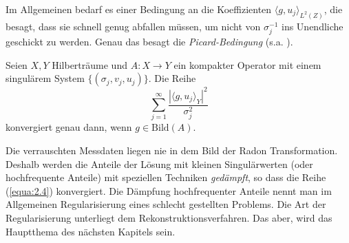 Im Allgemeinen bedarf es einer Bedingung an die Koeffizienten $\langle g, u_j \rangle_{L^2(Z)}$, die besagt, dass sie schnell genug abfallen müssen, um nicht von $\sigma_j^{-1}$ ins Unendliche geschickt zu werden. Genau das besagt die \textit{Picard-Bedingung} (s.a. \cite[S. 31]{Rieder03}).
\begin{theorem}
	Seien $X, Y$ Hilberträume und $A : X \rightarrow Y$ ein kompakter Operator mit einem singulärem System $\{(\sigma_j, v_j, u_j)\}$. Die Reihe 
	\begin{equation}
		\sum\limits_{j=1}^{\infty} \frac{|\langle g, u_j \rangle_Y|^2}{\sigma_j^2}
		\label{equa:2.4}
	\end{equation}
	konvergiert genau dann, wenn $g \in \mbox{Bild}(A)$.
	\label{satz:3}
\end{theorem}
Die verrauschten Messdaten liegen nie in dem Bild der Radon Transformation. Deshalb werden die Anteile der Lösung mit kleinen Singulärwerten (oder hochfrequente Anteile) mit speziellen Techniken \textit{gedämpft}, so dass die Reihe (\ref{equa:2.4}) konvergiert. Die Dämpfung hochfrequenter Anteile nennt man im Allgemeinen Regularisierung eines schlecht gestellten Problems. Die Art der Regularisierung unterliegt dem Rekonstruktionsverfahren. Das aber, wird das Hauptthema des nächsten Kapitels sein. 




